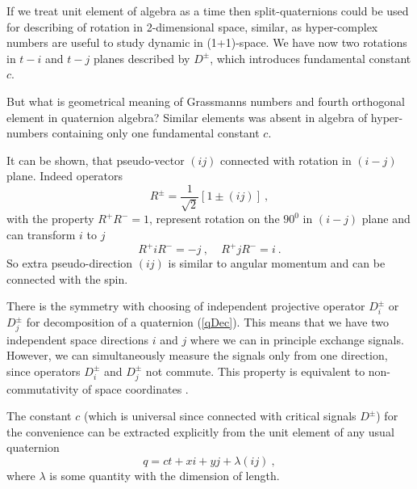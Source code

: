 \documentclass[a4paper,12pt]{article}
\begin{document}
If we treat unit element of algebra as a time then split-quaternions could be used 
for describing of rotation in 2-dimensional space, similar, as hyper-complex numbers 
are useful to study dynamic in (1+1)-space. We have now two rotations in $t-i$ and 
$t-j$ planes described by $D^\pm$, which introduces fundamental constant $c$. 

But what is geometrical meaning of Grassmanns numbers and fourth orthogonal element 
in quaternion algebra? Similar elements was absent in algebra of hyper-numbers 
containing only one fundamental constant $c$. 

It can be shown, that pseudo-vector $(ij)$ connected with rotation in $(i-j)$ plane. 
Indeed operators 
\begin{equation} \label{Rq}
R^\pm = \frac{1}{\sqrt{2}}[1 \pm (ij)] ~,
\end{equation} 
with the property $ R^+R^- = 1$, represent rotation on the $90^0$ in $(i-j)$ plane 
and can transform $i$ to $j$
\begin{equation} \label{i-j}
R^+iR^- = - j ~, ~~~~~ R^+jR^- = i~.
\end{equation} 
So extra pseudo-direction $(ij)$ is similar to angular momentum and can be connected 
with the spin. 

There is the symmetry with choosing of independent projective operator $D_i^\pm$ or 
$D_j^\pm$ for decomposition of a quaternion (\ref{qDec}). This means that we have two 
independent space directions $i$ and $j$ where we can in principle exchange signals. 
However, we can simultaneously measure the signals only from one direction, since 
operators $D_i^\pm$ and $D_j^\pm$ not commute. This property is equivalent to 
non-commutativity of space coordinates \cite{Non}.

The constant $c$ (which is universal since connected with critical signals $D^\pm$) 
for the convenience can be extracted explicitly from the unit element of any usual 
quaternion 
\begin{equation} \label{dual}
q = ct + xi + yj + \lambda (ij) ~,
\end{equation} 
where $\lambda$ is some quantity with the dimension of length. 
\end{document}
